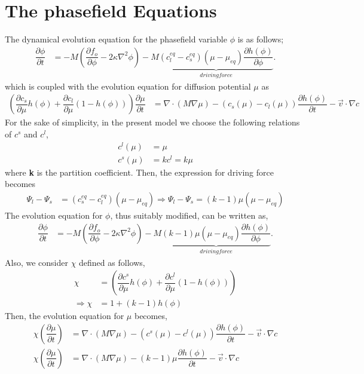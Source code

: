 \documentclass[12pt,a4paper]{report}
\begin{document}
\section{The phasefield Equations}
The dynamical evolution equation for the phasefield variable
$\phi$ is as follows;
  \begin{align}
  \dfrac{\partial \phi}{\partial t} &= -M \left(\dfrac{\partial f_o}{\partial \phi} - 2\kappa\nabla^{2}\phi\right)  
					-M\underbrace{(c_l^{eq} - c_s^{eq})\left(\mu-\mu_{eq}\right)\dfrac{\partial h\left(\phi\right)}{\partial \phi}}_{driving force}.
  \end{align}
which is coupled with the evolution equation for diffusion potential $\mu$ as
 \begin{align}
 \left(\dfrac{\partial c_s}{\partial \mu}h\left(\phi\right) + \dfrac{\partial c_l}{\partial \mu}(1-h\left(\phi\right))\right)
 \dfrac{\partial \mu}{\partial t} &= \nabla \cdot \left(M\nabla\mu\right) 
 - \left(c_s\left(\mu\right) - c_l \left(\mu\right)\right)\dfrac{\partial h\left(\phi\right)}{\partial t} - \vec{v}\cdot\nabla c
 \label{Mass-conservation-alloys}
 \end{align}
For the sake of simplicity, in the present model we choose the following relations of $c^s$ and $c^l$,
\begin{align}
c^l\left(\mu\right) &= \mu \\
c^s\left(\mu\right) &= kc^l = k\mu
\end{align}
where \textbf{k} is the partition coefficient.
Then, the expression for driving force becomes
\begin{align}
 \Psi_l-\Psi_s &= (c_s^{eq} - c_l^{eq})\left(\mu-\mu_{eq}\right)
\Rightarrow \Psi_l-\Psi_s = (k - 1)\mu\left(\mu-\mu_{eq}\right)
\end{align} 
The evolution equation for $\phi$, thus suitably modified, can be written as,
  \begin{align}
  \dfrac{\partial \phi}{\partial t} &= -M \left(\dfrac{\partial f_o}{\partial \phi} - 2\kappa\nabla^{2}\phi\right)  
					-M\underbrace{(k - 1)\mu\left(\mu-\mu_{eq}\right)\dfrac{\partial h\left(\phi\right)}{\partial \phi}}_{driving force}.
  \end{align}
Also, we consider $\chi$ defined as follows,
\begin{align}
	\chi  &= \left(\dfrac{\partial c^s}{\partial \mu}h\left(\phi\right) + \dfrac{\partial c^l}{\partial \mu}(1-h\left(\phi\right))\right)\\
	\Rightarrow\chi &= 1 + \left(k-1\right)h\left(\phi\right)
\end{align}
Then, the evolution equation for $\mu$ becomes,
\begin{align}
		\chi \left(\dfrac{\partial \mu}{\partial t}\right) &= \nabla \cdot \left(M\nabla\mu\right) 
	- \left(c^s\left(\mu\right) - c^l \left(\mu\right)\right)\dfrac{\partial h\left(\phi\right)}{\partial t}- \vec{v}\cdot\nabla c\\
		\chi \left(\dfrac{\partial \mu}{\partial t}\right) &= \nabla \cdot \left(M\nabla\mu\right) 
	- \left(k-1\right)\mu\dfrac{\partial h\left(\phi\right)}{\partial t}- \vec{v}\cdot\nabla c
\end{align}
\end{document}
